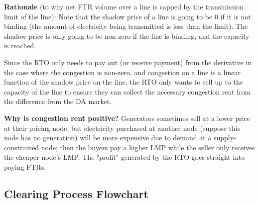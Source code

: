 \documentclass[11pt]{article}
\begin{document}
\textbf{Rationale} (to why net FTR volume over a line is capped by the transmission limit of the line): Note that the shadow price of a line is going to be 0 if it is not binding (the amount of electricity being transmitted is less than the limit). The shadow price is only going to be non-zero if the line is binding, and the capacity is reached.

Since the RTO only needs to pay out (or receive payment) from the derivative in the case where the congestion is non-zero, and congestion on a line is a linear function of the shadow price on the line, the RTO only wants to sell up to the capacity of the line to ensure they can collect the necessary congestion rent from the difference from the DA market.

\textbf{Why is congestion rent positive? } Generators sometimes sell at a lower price at their pricing node, but electricity purchased at another node (suppose this node has no generation) will be more expensive due to demand at a supply-constrained node; then the buyers pay a higher LMP while the seller only receives the cheaper node's LMP. The "profit" generated by the RTO goes straight into paying FTRs.

\subsection{Clearing Process Flowchart}

\begin{center}
\end{center}
\end{document}
